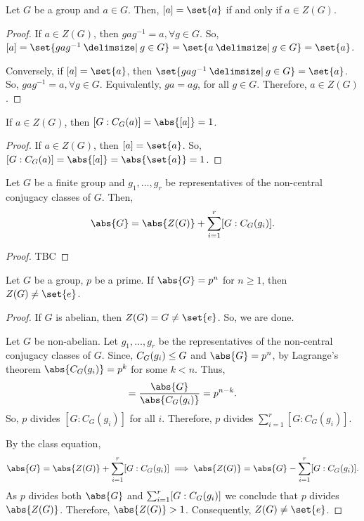 \documentclass[11pt]{penrose}
\begin{document}
\begin{nlemma}
    Let $G$ be a group and $a \in G$. Then, $[a] = \set{a}$ if and only if $a \in Z(G)$.
\end{nlemma}
\begin{proof}
    If $a \in Z(G)$, then $g a g^{-1} = a, \forall g \in G$. So, $[a] = \set{g a g^{-1} \st g \in G} = \set{a \st g \in G} = \set{a}$.

    Conversely, if $[a] = \set{a}$, then $\set{g a g^{-1} \st g \in G} = \set{a}$. So, $g a g^{-1} = a, \forall g \in G$. Equivalently, $ga = ag$, for all $g \in G$. Therefore, $a \in Z(G)$.
\end{proof}

\begin{ncor}
    If $a \in Z(G)$, then $[G : C_{G}(a)] = \abs{ [a] } = 1$.
\end{ncor}
\begin{proof}
    If $a \in Z(G)$, then $[a] = \set{a}$. So, $[G : C_{G}(a)] = \abs{[a]} = \abs{\set{a}} = 1$.
\end{proof}

\begin{nthm}
    Let $G$ be a finite group and $g_{1}, \dots, g_{r}$ be representatives of the non-central conjugacy classes of $G$. Then,
    \begin{equation*}
        \abs{G} = \abs{Z(G)} + \sum_{i=1}^{r} [G : C_{G}(g_{i})].
    \end{equation*}
\end{nthm}
\begin{proof}
    TBC
\end{proof}

\begin{nthm}
    Let $G$ be a group, $p$ be a prime. If $\abs{G} = p^{n}$ for $n \geq 1$, then $Z(G) \neq \set{e}$.
\end{nthm}
\begin{proof}
    If $G$ is abelian, then $Z(G) = G \neq \set{e}$. So, we are done.

    Let $G$ be non-abelian. Let $g_{1}, \dots, g_{r}$ be the representatives of the non-central conjugacy classes of $G$. Since, $C_{G}(g_{i}) \mathrel{\leq} G$ and $\abs{G} = p^{n}$, by Lagrange's theorem $\abs{C_{G}(g_{i})} = p^{k}$ for some $k < n$. Thus,
    \begin{equation*}
        [G : C_{G}(g_{i})] = \frac{\abs{G}}{\abs{C_{G}(g_{i})}} = p^{n-k}.
    \end{equation*}
    So, $p$ divides $[G : C_{G}(g_{i})]$ for all $i$. Therefore, $p$ divides $\sum_{i=1}^{r} [G : C_{G}(g_{i})]$.

    By the class equation,
    \begin{equation*}
        \abs{G} = \abs{Z(G)} + \sum_{i=1}^{r} \comm{G : C_{G}(g_{i})}
        \implies
        \abs{Z(G)} = \abs{G} - \sum_{i=1}^{r} \comm{G : C_{G}(g_{i})}.
    \end{equation*}
    As $p$ divides both $\abs{G}$ and $\sum_{i=1}^{r} \lbrack G : C_{G}(g_{i})\rbrack$ we conclude that $p$ divides $\abs{Z(G)}$. Therefore, $\abs{Z(G)} > 1$. Consequently, $Z(G) \neq \set{e}$.
\end{proof}
\end{document}
